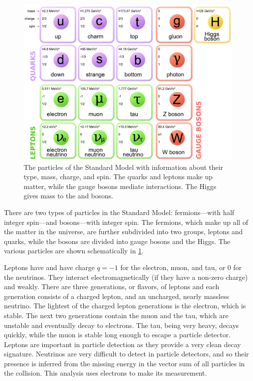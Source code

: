 \begin{figure}[!htbp]
    \centering
    \includegraphics[width=\textwidth]{figures/standard_model.pdf}
    \caption[
        The particles of the Standard Model.
    ]{
        The particles of the Standard Model with information about their type,
        mass, charge, and spin. The quarks and leptons make up matter, while
        the gauge bosons mediate interactions. The Higgs gives mass to the \W
        and \Z bosons.
    }
    \label{fig:standard_model}
\end{figure}

There are two types of particles in the Standard Model: fermions---with half
integer spin---and bosons---with integer spin. The fermions, which make up all
of the matter in the universe, are further subdivided into two groups, leptons
and quarks, while the bosons are divided into gauge bosons and the Higgs.  The
various particles are shown schematically in \cref{fig:standard_model}.

Leptons have \spinhalf and have charge $q=-1$ for the electron, muon, and tau,
or 0 for the neutrinos. They interact electromagnetically (if they have a
non-zero charge) and weakly. There are three generations, or flavors, of
leptons and each generation consists of a charged lepton, and an uncharged,
nearly massless neutrino. The lightest of the charged lepton generations is the
electron, which is stable. The next two generations contain the muon and the
tau, which are unstable and eventually decay to electrons. The tau, being very
heavy, decays quickly, while the muon is stable long enough to escape a
particle detector. Leptons are important in particle detection as they provide
a very clean decay signature. Neutrinos are very difficult to detect in
particle detectors, and so their presence is inferred from the missing energy
in the vector sum of all particles in the collision. This analysis uses
electrons to make its measurement.

